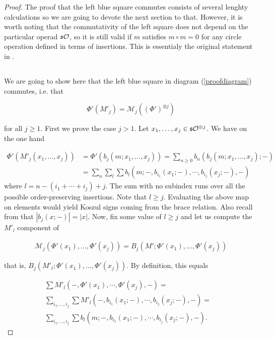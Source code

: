 \documentclass[Thesis.tex]{subfiles}
\begin{document}
\begin{proof}
The proof that the left blue square commutes consists of several lenghty calculations so we are going to devote the next section to that. However, it is worth noting that the commutativity of the left square does not depend on the particular operad $\mathfrak{s}{\mathcal O}$, so it is still valid if $m$ satisfies $m\circ m=0$ for any circle operation defined in terms of insertions. This is essentialy the original statement in \cite{GV}.
\subsection*{}
We are going to show here that the left blue square in diagram (\ref{proofdiagram}) commutes, i.e. that 

\begin{equation}\label{commutative}
\Phi'(M'_j)=\mathcal{M}_j((\Phi')^{\otimes j})
\end{equation}

for all $j\geq 1$. First we prove the case $j>1$. Let $x_1,\dots, x_j\in \mathfrak{s}{\mathcal O}^{\otimes j}$. We have on the one hand



\begin{align*}
\Phi'(M'_j(x_1,\dots, x_j))& = \Phi'(b_j(m;x_1,\dots, x_j))=\sum_{n\geq 0} b_n(b_j(m;x_1,\dots, x_j);-)\\
&=\sum_n\sum_l\sum b_l(m; -, b_{i_1}(x_1;-),\cdots,b_{i_j}(x_j;-),-)
\end{align*}
where $l=n-(i_1+\cdots+i_j)+j$. The sum with no subindex runs over all the possible order-preserving insertions. Note that $l\geq j$. Evaluating the above map on elements would yield Koszul signs coming from the brace relation. Also recall from  that $|b_j(x;-)|=|x|$. Now, fix some value of $l\geq j$ and let us compute the $M'_l$ component of

\begin{align*}
\mathcal{M}_j(\Phi'(x_1),\dots, \Phi'(x_j))=B_j(M';\Phi'(x_1),\dots, \Phi'(x_j))
\end{align*}

that is, $B_j(M'_l;\Phi'(x_1),\dots, \Phi'(x_j))$. By definition, this equals

\begin{align*}
\sum M'_l(-,\Phi'(x_1),\cdots, \Phi'(x_j),-)=&\\
\sum_{i_1,\dots, i_j}\sum M'_l(-,b_{i_1}(x_1;-),\cdots,b_{i_j}(x_j;-),-)=\\
\sum_{i_1,\dots, i_j}\sum b_l(m;-,b_{i_1}(x_1;-),\cdots,b_{i_j}(x_j;-),-).
\end{align*}


\end{proof}
\end{document}
